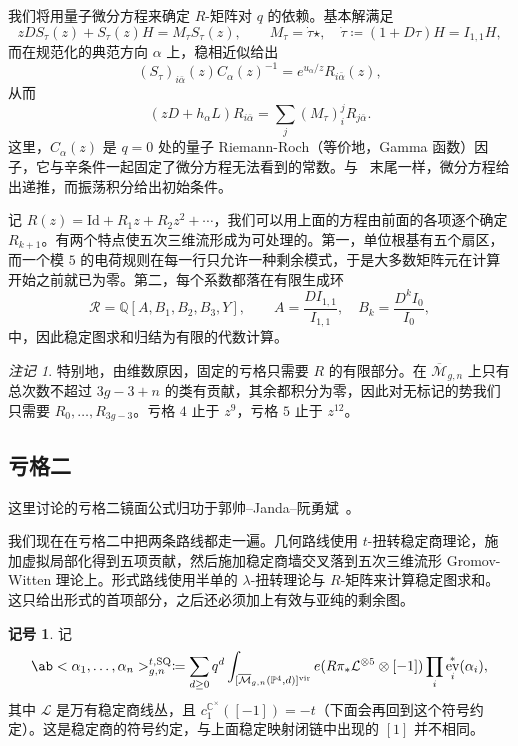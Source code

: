 \documentclass{amsart}
\theoremstyle{definition}
\newtheorem{notn}[thm]{记号}
\theoremstyle{remark}
\newtheorem{rmk}[thm]{注记}
\theoremstyle{plain}
\theoremstyle{definition}
\theoremstyle{remark}
\newcommand{\C}{\mathbb{C}}
\newcommand{\Q}{\mathbb{Q}}
\renewcommand{\P}{\mathbb{P}}
\newcommand{\Mbar}{\overline{\mathcal{M}}}
\newcommand{\mc}[1]{\mathcal{#1}}
\newcommand{\mr}[1]{\mathrm{#1}}
\newcommand{\1}{\mathbf{1}}
\newcommand{\2}{\mathbf{2}}
\newcommand{\3}{\mathbf{3}}
\newcommand{\vir}{\mr{vir}}
\DeclareMathOperator{\ev}{ev}
\begin{document}
我们将用量子微分方程来确定 \(R\)-矩阵对 \(q\) 的依赖。基本解满足
\[ zDS_{\tau}(z) + S_{\tau}(z)H = M_{\tau}S_{\tau}(z), \qquad M_{\tau} = \dot{\tau}\star, \quad \dot{\tau} \coloneqq (1+D\tau)H = I_{1,1}H, \]
而在规范化的典范方向 \(\alpha\) 上，稳相近似给出
\[ (S_{\tau})_{i\bar{\alpha}}(z)C_{\alpha}(z)^{-1} = e^{u_{\alpha}/z}R_{i\bar{\alpha}}(z), \]
从而
\[ (zD+h_{\alpha}L)R_{i\bar{\alpha}} = \sum_j (M_{\tau})_i^j R_{j\bar{\alpha}}. \]
这里，\(C_{\alpha}(z)\) 是 \(q=0\) 处的量子 Riemann-Roch（等价地，Gamma 函数）因子，它与辛条件一起固定了微分方程无法看到的常数。与~ 末尾一样，微分方程给出递推，而振荡积分给出初始条件。

记 \(R(z) = \mr{Id} + R_1 z + R_2 z^2 + \cdots\)，我们可以用上面的方程由前面的各项逐个确定 \(R_{k+1}\)。有两个特点使五次三维流形成为可处理的。第一，单位根基有五个扇区，而一个模 \(5\) 的电荷规则在每一行只允许一种剩余模式，于是大多数矩阵元在计算开始之前就已为零。第二，每个系数都落在有限生成环
\[ \mc{R} = \Q[A,B_1,B_2,B_3,Y], \qquad A = \frac{DI_{1,1}}{I_{1,1}}, \quad B_k = \frac{D^k I_0}{I_0}, \]
中，因此稳定图求和归结为有限的代数计算。

\begin{rmk}
    特别地，由维数原因，固定的亏格只需要 \(R\) 的有限部分。在 \(\Mbar_{g,n}\) 上只有总次数不超过 \(3g-3+n\) 的类有贡献，其余都积分为零，因此对无标记的势我们只需要 \(R_0, \ldots, R_{3g-3}\)。亏格 \(4\) 止于 \(z^9\)，亏格 \(5\) 止于 \(z^{12}\)。
\end{rmk}

\subsection{亏格二}%
\label{sub:Genus two}

这里讨论的亏格二镜面公式归功于郭帅–Janda–阮勇斌~\cite{GJRgenus2}。

我们现在在亏格二中把两条路线都走一遍。几何路线使用 \(t\)-扭转稳定商理论，施加虚拟局部化得到五项贡献，然后施加稳定商墙交叉落到五次三维流形 Gromov-Witten 理论上。形式路线使用半单的 \(\lambda\)-扭转理论与 \(R\)-矩阵来计算稳定图求和。这只给出形式的首项部分，之后还必须加上有效与亚纯的剩余图。

\begin{notn}
    记
    \[ \ab<\alpha_1, \ldots, \alpha_n>^{t,\mr{SQ}}_{g,n} \coloneqq \sum_{d\geq0}q^d \int_{[\Mbar_{g,n}(\P^4,d)]^{\vir}}e(R\pi_*\mc{L}^{\otimes 5}\otimes[-1])\prod_i \ev_i^*(\alpha_i), \]
    其中 \(\mc{L}\) 是万有稳定商线丛，且 \(c_1^{\C^{\times}}([-1]) = -t\)（下面会再回到这个符号约定）。这是稳定商的符号约定，与上面稳定映射闭链中出现的 \([1]\) 并不相同。
\end{notn}
\end{document}
